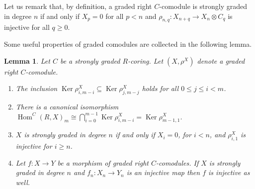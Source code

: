 \documentclass[pdftex]{sigma}
\DeclareMathOperator{\Ker}{Ker}
\newcommand\ot{\otimes}
\renewcommand{\^}[1]{\mbox{$^{\left( #1 \right)}$}}
\renewcommand{\_}[1]{\mbox{$_{\left( #1 \right)}$}}
\newcommand\Hom{\operatorname{Hom}}
\numberwithin{equation}{section}
\newtheorem{Lemma}[Theorem]{Lemma}
\begin{document}
Let us remark that, by def\/inition, a graded right $C$-comodule is strongly graded in degree $n$ if and only if $X_p=0$ for all $p<n$ and $\rho_{n,q}\colon X_{n+q}\to X_n\ot C_q$ is injective for all $q\geq 0$.

Some useful properties of graded comodules are collected in the following lemma.

\begin{Lemma}\label{le:strongly_graded_n}
Let $C$ be a strongly graded $R$-coring. Let $(X,\rho^X)$ denote a graded right $C$-comodule.
\begin{enumerate}\itemsep=0pt
 \item[$1.$] The inclusion $\Ker\rho^X_{i,m-i}\subseteq \Ker\rho^X_{j,m-j}$ holds for all $0\leq j\leq i < m$.

 \item[$2.$] There is a canonical isomorphism $\Hom^C(R,X)_m\cong\bigcap_{i=0}^{m-1}\Ker\rho^X_{i,m-i}=\Ker\rho^X_{m-1,1}$.

 \item[$3.$] $X$ is strongly graded in degree $n$ if and only if $X_i=0$, for $i<n$, and $\rho_{i,1}^X$ is injective for $i\geq n$.

 \item[$4.$] Let $f\colon X\to Y$ be a morphism of graded right $C$-comodules. If $X$ is strongly graded in degree $n$ and $f_n\colon X_n\to Y_n$ is an injective map then $f$ is injective as well.
 \end{enumerate}
\end{Lemma}
\end{document}
